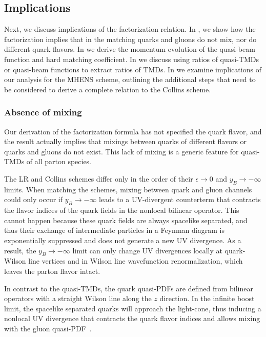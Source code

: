 \documentclass[11pt,a4paper]{article}
\newcommand{\eps}{\epsilon}
\begin{document}
\subsection{Implications}
\label{sec:implications}

Next, we discuss implications of the factorization relation.
In , we show how the factorization implies that in the matching quarks and gluons do not mix, nor do different quark flavors. 
In  we derive the momentum evolution of the quasi-beam function and hard matching coefficient.
In  we discuss using ratios of quasi-TMDs or quasi-beam functions to extract ratios of TMDs.
In  we examine implications of our analysis for the MHENS scheme, outlining the additional steps that need to be considered to derive a complete relation to the Collins scheme.

\subsubsection{Absence of mixing}
\label{sec:nomixing}

Our derivation of the factorization formula has not specified the quark flavor, and the result actually implies that mixings between quarks of different flavors or quarks and gluons do not exist. This lack of mixing is a generic feature for quasi-TMDs of all parton species.

The LR and Collins schemes differ only in the order of their $\eps\to0$ and $y_B\to-\infty$ limits.
When matching the schemes, mixing between quark and gluon channels could only occur if $y_B\to -\infty$ leads to a UV-divergent counterterm that contracts the flavor indices of the quark fields in the nonlocal bilinear operator.
This cannot happen because these quark fields are always spacelike separated, and thus their exchange of intermediate particles in a Feynman diagram is exponentially suppressed and does not generate a new UV divergence.
As a result, the $y_B\to-\infty$ limit can only change UV divergences locally at quark-Wilson line vertices and in Wilson line wavefunction renormalization, which leaves the parton flavor intact.

In contrast to the quasi-TMDs, the quark quasi-PDFs are defined from bilinear operators with a straight Wilson line along the $z$ direction. In the infinite boost limit, the spacelike separated quarks will approach the light-cone, thus inducing a nonlocal UV divergence that contracts the quark flavor indices and allows mixing with the gluon quasi-PDF~\cite{Zhang:2018diq}. 
\end{document}
